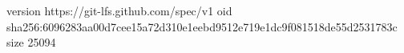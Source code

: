 version https://git-lfs.github.com/spec/v1
oid sha256:6096283aa00d7cee15a72d310e1eebd9512e719e1dc9f081518de55d2531783c
size 25094
